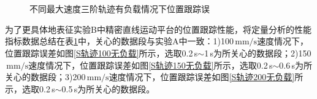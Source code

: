 \begin{figure}[H]\centering
	\\
	\\
	\caption{不同最大速度三阶轨迹有负载情况下位置跟踪误}\label{不同最大速度三阶S轨迹有负载情况下位置跟踪误}
\end{figure}
为了更具体地表征实验B中精密直线运动平台的位置跟踪性能，将定量分析的性能指标数据总结在表\ref{不同最大速度三阶S轨迹有负载情况下位置跟踪误}中，关心的数据段与实验A中一致：1)100$\,\text{mm/s}$速度情况下，位置跟踪误差如图\ref{S轨迹100无负载}所示，选取0.2\,s$\sim$1\,s为所关心的数据段；2)150$\,\text{mm/s}$速度情况下，位置跟踪误差如图\ref{S轨迹150无负载}所示，选取0.2\,s$\sim$0.6\,s为所关心的数据段；3)200$\,\text{mm/s}$速度情况下，位置跟踪误差如图\ref{S轨迹200无负载}所示，选取0.2\,s$\sim$0.5\,s为所关心的数据段。
